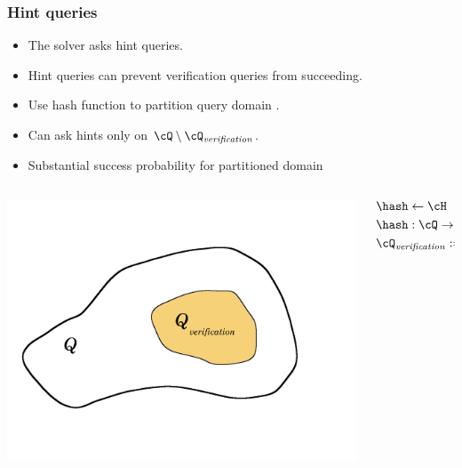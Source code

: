 \documentclass[first,firstsupp,handout,last]{ETHclass}
\begin{document}
\begin{frame}[t]
  \frametitle{Hint queries}
  \begin{itemize}
    \item The solver asks hint queries.
    \item Hint queries can prevent verification queries from succeeding.
    \item Use hash function to partition query domain \cite{dodis2009security}.
    \item Can ask hints only on $\cQ \setminus \cQ_{\mathit{verification}}$.
    \item Substantial success probability for partitioned domain
  \end{itemize}
  \begin{columns}
    \begin{column}{.4\textwidth}
      \includegraphics[scale=0.08]{images/hashSets.pdf}
    \end{column}
    \begin{column}{.4\textwidth}
      \begin{align*}
        &\hash \leftarrow \cH \\
        &\hash : \cQ \rightarrow \{0,1,\dots, 2(h+v) - 1\} \\
        &\cQ_{\mathit{verification}} := {q \in \cQ : hash(q) = 0}
      \end{align*}
    \end{column}
  \end{columns}
\end{frame}
\end{document}
